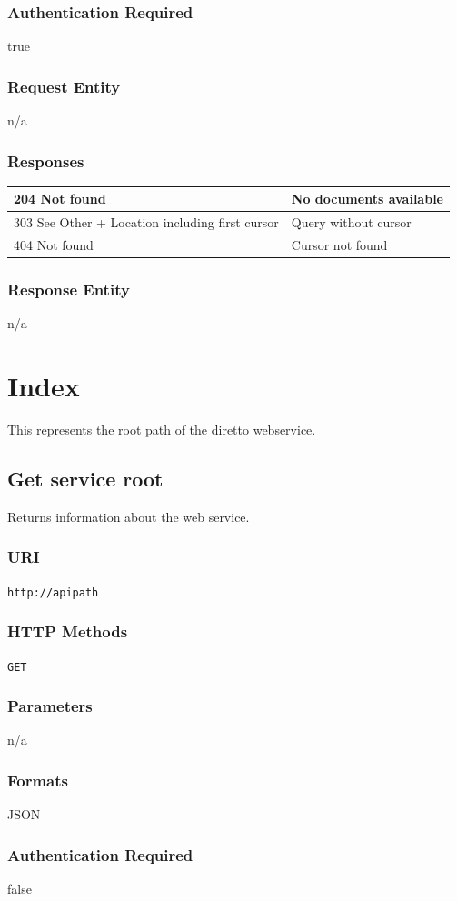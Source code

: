 \documentclass[10pt]{article}
\begin{document}
\subsubsection{Authentication Required}
true
\subsubsection{Request Entity}
n/a
\subsubsection{Responses}
\begin{tabular}{|l|l|}\hline
204 Not found & No documents available \\
\hline
303 See Other + Location including first cursor & Query without cursor \\
\hline
404 Not found & Cursor not found \\
\hline
\end{tabular}
\subsubsection{Response Entity}
n/a
\section{Index}
This represents the root path of the diretto webservice.
\subsection{Get service root }
Returns information about the web service.
\subsubsection{URI}
\texttt{http://apipath
}\subsubsection{HTTP Methods}
\texttt{GET}
\subsubsection{Parameters}
n/a
\subsubsection{Formats}
JSON
\subsubsection{Authentication Required}
false
\end{document}

